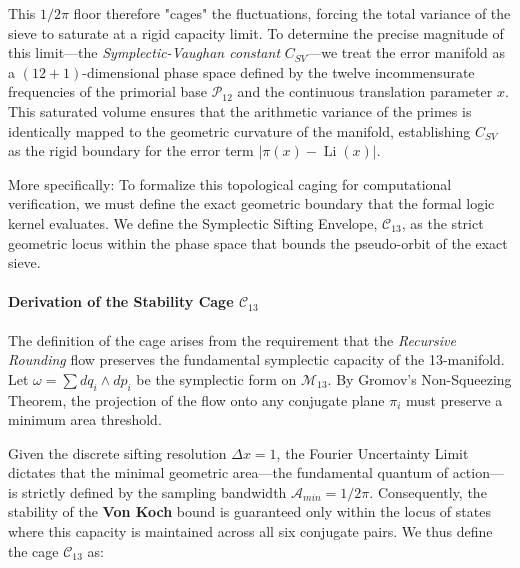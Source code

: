 \documentclass[sn-mathphys-num, pdflatex]{sn-jnl}
\begin{document}
This $1/2\pi$ floor therefore "cages" the fluctuations, forcing the total variance of the sieve to saturate at a rigid capacity limit. To determine the precise magnitude of this limit—the \textit{Symplectic-Vaughan constant} $C_{SV}$—we treat the error manifold as a $(12+1)$-dimensional phase space defined by the twelve incommensurate frequencies of the primorial base $\mathcal{P}_{12}$ and the continuous translation parameter $x$. This saturated volume ensures that the arithmetic variance of the primes is identically mapped to the geometric curvature of the manifold, establishing $C_{SV}$ as the rigid boundary for the error term $|\pi(x) - \operatorname{Li}(x)|$.

More specifically:
To formalize this topological caging for computational verification, we must define the exact geometric boundary that the formal logic kernel evaluates. We define the Symplectic Sifting Envelope, $\mathcal{C}_{13}$, as the strict geometric locus within the phase space that bounds the pseudo-orbit of the exact sieve.

\paragraph{Derivation of the Stability Cage \texorpdfstring{$\mathcal{C}_{13}$}{C13}}

The definition of the cage arises from the requirement that the \textit{Recursive Rounding} flow preserves the fundamental symplectic capacity of the 13-manifold. Let $\omega = \sum dq_i \wedge dp_i$ be the symplectic form on $\mathcal{M}_{13}$. By Gromov's Non-Squeezing Theorem, the projection of the flow onto any conjugate plane $\pi_i$ must preserve a minimum area threshold. 

Given the discrete sifting resolution $\Delta x = 1$, the Fourier Uncertainty Limit dictates that the minimal geometric area---the fundamental quantum of action---is strictly defined by the sampling bandwidth $\mathcal{A}_{min} = 1/2\pi$. Consequently, the stability of the \textbf{Von Koch} bound is guaranteed only within the locus of states where this capacity is maintained across all six conjugate pairs. We thus define the cage $\mathcal{C}_{13}$ as:
\end{document}
